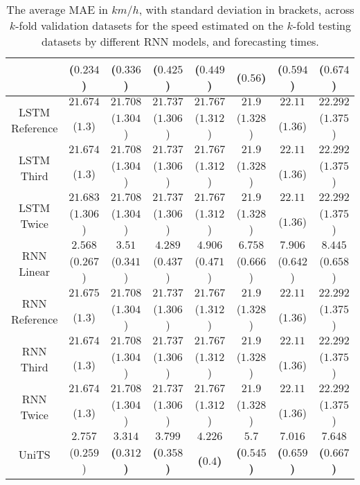\begin{table}[!ht]
{\begin{tabular}{|c|c|c|c|c|c|c|c|}
			 & \textbf{(}$\mathbf{0.234}$\textbf{)} & ($0.336$) & ($0.425$) & ($0.449$) & ($0.56$) & ($0.594$) & ($0.674$) \\ \hline
			\multirow{2}{*}{LSTM Reference} & $21.674$ & $21.708$ & $21.737$ & $21.767$ & $21.9$ & $22.11$ & $22.292$ \\
			 & ($1.3$) & ($1.304$) & ($1.306$) & ($1.312$) & ($1.328$) & ($1.36$) & ($1.375$) \\ \hline
			\multirow{2}{*}{LSTM Third} & $21.674$ & $21.708$ & $21.737$ & $21.767$ & $21.9$ & $22.11$ & $22.292$ \\
			 & ($1.3$) & ($1.304$) & ($1.306$) & ($1.312$) & ($1.328$) & ($1.36$) & ($1.375$) \\ \hline
			\multirow{2}{*}{LSTM Twice} & $21.683$ & $21.708$ & $21.737$ & $21.767$ & $21.9$ & $22.11$ & $22.292$ \\
			 & ($1.306$) & ($1.304$) & ($1.306$) & ($1.312$) & ($1.328$) & ($1.36$) & ($1.375$) \\ \hline
			\multirow{2}{*}{RNN Linear} & $2.568$ & $3.51$ & $4.289$ & $4.906$ & $6.758$ & $7.906$ & $8.445$ \\
			 & ($0.267$) & ($0.341$) & ($0.437$) & ($0.471$) & ($0.666$) & ($0.642$) & ($0.658$) \\ \hline
			\multirow{2}{*}{RNN Reference} & $21.675$ & $21.708$ & $21.737$ & $21.767$ & $21.9$ & $22.11$ & $22.292$ \\
			 & ($1.3$) & ($1.304$) & ($1.306$) & ($1.312$) & ($1.328$) & ($1.36$) & ($1.375$) \\ \hline
			\multirow{2}{*}{RNN Third} & $21.674$ & $21.708$ & $21.737$ & $21.767$ & $21.9$ & $22.11$ & $22.292$ \\
			 & ($1.3$) & ($1.304$) & ($1.306$) & ($1.312$) & ($1.328$) & ($1.36$) & ($1.375$) \\ \hline
			\multirow{2}{*}{RNN Twice} & $21.674$ & $21.708$ & $21.737$ & $21.767$ & $21.9$ & $22.11$ & $22.292$ \\
			 & ($1.3$) & ($1.304$) & ($1.306$) & ($1.312$) & ($1.328$) & ($1.36$) & ($1.375$) \\ \hline
			\multirow{2}{*}{UniTS} & $2.757$ & $\mathbf{3.314}$ & $\mathbf{3.799}$ & $\mathbf{4.226}$ & $\mathbf{5.7}$ & $\mathbf{7.016}$ & $\mathbf{7.648}$ \\
			 & ($0.259$) & \textbf{(}$\mathbf{0.312}$\textbf{)} & \textbf{(}$\mathbf{0.358}$\textbf{)} & \textbf{(}$\mathbf{0.4}$\textbf{)} & \textbf{(}$\mathbf{0.545}$\textbf{)} & \textbf{(}$\mathbf{0.659}$\textbf{)} & \textbf{(}$\mathbf{0.667}$\textbf{)} \\ \hline
		\end{tabular}
	}
	\caption{The average MAE in $km/h$, with standard deviation in brackets, across $k$-fold validation datasets for the speed estimated on the $k$-fold testing datasets by different RNN models, and forecasting times.}
	\label{tab:all_speed_MAE}
\end{table}

